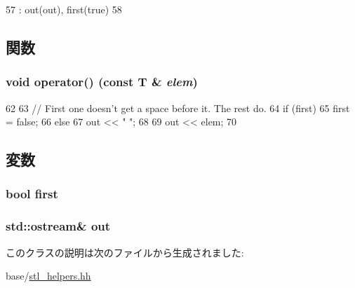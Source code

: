 \begin{DoxyCode}
57         : out(out), first(true)
58     {}
\end{DoxyCode}


\subsection{関数}
\hypertarget{classm5_1_1stl__helpers_1_1ContainerPrint_a22291398c467d0b6b717e6a5d98421cb}{
\subsubsection[{operator()}]{\setlength{\rightskip}{0pt plus 5cm}void operator() (const T \& {\em elem})}}
\label{classm5_1_1stl__helpers_1_1ContainerPrint_a22291398c467d0b6b717e6a5d98421cb}



\begin{DoxyCode}
62     {
63         // First one doesn't get a space before it.  The rest do.
64         if (first)
65             first = false;
66         else
67             out << " ";
68 
69         out << elem;
70     }
\end{DoxyCode}


\subsection{変数}
\hypertarget{classm5_1_1stl__helpers_1_1ContainerPrint_a77e49fc0956d412a05337460c7778c6d}{
\subsubsection[{first}]{\setlength{\rightskip}{0pt plus 5cm}bool {\bf first}}}
\label{classm5_1_1stl__helpers_1_1ContainerPrint_a77e49fc0956d412a05337460c7778c6d}
\hypertarget{classm5_1_1stl__helpers_1_1ContainerPrint_ad61aa84163ca07736ad2f6cf1eeb19cf}{
\subsubsection[{out}]{\setlength{\rightskip}{0pt plus 5cm}std::ostream\& {\bf out}}}
\label{classm5_1_1stl__helpers_1_1ContainerPrint_ad61aa84163ca07736ad2f6cf1eeb19cf}


このクラスの説明は次のファイルから生成されました:\begin{DoxyCompactItemize}
\item 
base/\hyperlink{stl__helpers_8hh}{stl\_\-helpers.hh}\end{DoxyCompactItemize}
